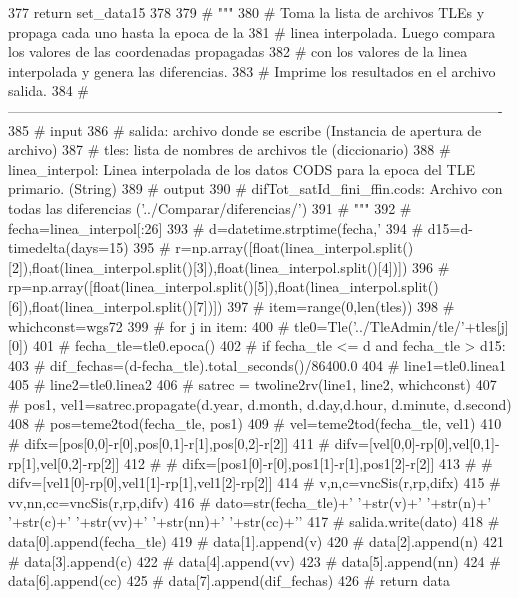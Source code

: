\begin{DoxyCode}
377     return set_data15
378     
379 #     """
380 #     Toma la lista de archivos TLEs y propaga cada uno hasta la epoca de la
381 #     linea interpolada. Luego compara los valores de las coordenadas
       propagadas
382 #     con los valores de la linea interpolada y genera las diferencias. 
383 #     Imprime los resultados en el archivo salida.     
384 #    
       ----------------------------------------------------------------------------------------------------------
385 #     input
386 #         salida: archivo donde se escribe (Instancia de apertura de archivo)
387 #         tles: lista de nombres de archivos tle (diccionario)
388 #         linea_interpol: Linea interpolada de los datos CODS para la epoca del
       TLE primario. (String)
389 #     output
390 #         difTot_satId_fini_ffin.cods: Archivo con todas las diferencias
       ('../Comparar/diferencias/')
391 #     """
392 #     fecha=linea_interpol[:26]
393 #     d=datetime.strptime(fecha,'%
394 #     d15=d-timedelta(days=15)
395 #    
       r=np.array([float(linea_interpol.split()[2]),float(linea_interpol.split()[3]),float(linea_interpol.split()[4])])
396 #    
       rp=np.array([float(linea_interpol.split()[5]),float(linea_interpol.split()[6]),float(linea_interpol.split()[7])])
397 #     item=range(0,len(tles))
398 #     whichconst=wgs72
399 #     for j in item:
400 #         tle0=Tle('../TleAdmin/tle/'+tles[j][0])
401 #         fecha_tle=tle0.epoca()
402 #         if fecha_tle <= d and fecha_tle > d15:
403 #             dif_fechas=(d-fecha_tle).total_seconds()/86400.0
404 #             line1=tle0.linea1
405 #             line2=tle0.linea2
406 #             satrec = twoline2rv(line1, line2, whichconst)
407 #             pos1, vel1=satrec.propagate(d.year, d.month, d.day,d.hour,
       d.minute, d.second)
408 #             pos=teme2tod(fecha_tle, pos1)
409 #             vel=teme2tod(fecha_tle, vel1)
410 #             difx=[pos[0,0]-r[0],pos[0,1]-r[1],pos[0,2]-r[2]]
411 #             difv=[vel[0,0]-rp[0],vel[0,1]-rp[1],vel[0,2]-rp[2]]
412 # #             difx=[pos1[0]-r[0],pos1[1]-r[1],pos1[2]-r[2]]
413 # #             difv=[vel1[0]-rp[0],vel1[1]-rp[1],vel1[2]-rp[2]]
414 #             v,n,c=vncSis(r,rp,difx)
415 #             vv,nn,cc=vncSis(r,rp,difv)
416 #             dato=str(fecha_tle)+' '+str(v)+' '+str(n)+' '+str(c)+'
       '+str(vv)+' '+str(nn)+' '+str(cc)+'\n'
417 #             salida.write(dato)
418 #             data[0].append(fecha_tle)
419 #             data[1].append(v)
420 #             data[2].append(n)
421 #             data[3].append(c)
422 #             data[4].append(vv)
423 #             data[5].append(nn)
424 #             data[6].append(cc)
425 #             data[7].append(dif_fechas)
426 #     return data

\end{DoxyCode}


